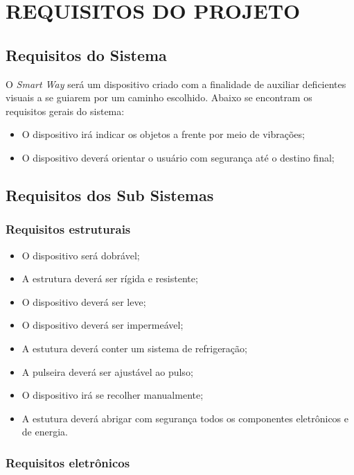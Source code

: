 \chapter[Requisitos do projeto]{REQUISITOS DO PROJETO}

\section{Requisitos do Sistema}

O \textit{Smart Way} será um dispositivo criado com a finalidade de auxiliar deficientes visuais a se guiarem por um caminho escolhido. Abaixo se encontram os requisitos gerais do sistema:

\begin{itemize}
\item O dispositivo irá indicar os objetos a frente por meio de vibrações;
\item O dispositivo deverá orientar o usuário com segurança até o destino final;
\end{itemize}

\section{Requisitos dos Sub Sistemas}

\subsection{Requisitos estruturais}

\begin{itemize}
\item O dispositivo será dobrável; 
\item A estrutura deverá ser rígida e resistente;
\item O dispositivo deverá ser leve;
\item O dispositivo deverá ser impermeável;
\item A estutura deverá conter um sistema de refrigeração; 
\item A pulseira deverá ser ajustável ao pulso;
\item O dispositivo irá se recolher manualmente;
\item A estutura deverá abrigar com segurança todos os componentes eletrônicos e de energia.
\end{itemize}

\subsection{Requisitos eletrônicos}

